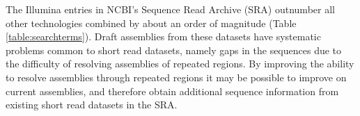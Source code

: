 \documentclass[10pt]{article}
\makeatletter
\newcommand{\cmidrules}[1]{%
  \noalign{%
    \global\MD@cmidrules={}%
    \toks@={\cmidrule(l{.3\tabcolsep}r{.3\tabcolsep})}%
    \count@=\z@
    \loop\ifnum\count@<#1\relax
      \advance\count@\@ne
      \edef\MD@temp{\the\toks@{\the\count@-\the\count@}}%
      \global\MD@cmidrules\expandafter{\the\expandafter\MD@cmidrules\MD@temp}%
    \repeat
  }%
  \the\MD@cmidrules
}
\makeatother
\begin{document}
\begin{linenumbers}
\begin{table}[!h]
\end{table}



The Illumina entries in NCBI's Sequence Read Archive (SRA) \cite{Kodama2012} outnumber all other technologies combined by about an order of magnitude (Table \ref{table:searchterms}). Draft assemblies from these datasets have systematic problems common to short read datasets, namely gaps in the sequences due to the difficulty of resolving assemblies of repeated regions\cite{Whiteford2005,Treangen 2013}. By improving the ability to resolve assemblies through repeated regions  it may be possible to improve on current assemblies, and therefore obtain additional sequence information from existing short read datasets in the SRA.




\end{linenumbers}
\end{document}
